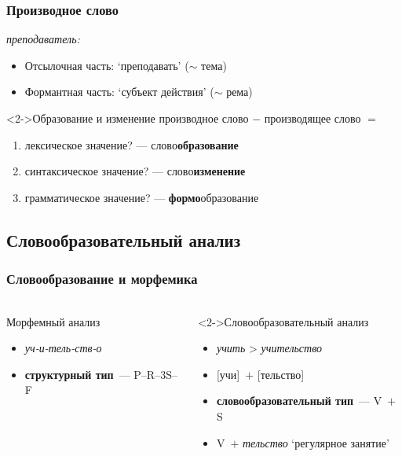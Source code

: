 \begin{frame}
    \frametitle{Производное слово}

    \textit{преподаватель:} \begin{itemize}
        \item Отсылочная часть: `преподавать' ($\sim$ тема)
        \item Формантная часть: `субъект действия' ($\sim$ рема)
    \end{itemize}

    \vfill

    \begin{block}<2->{Образование и изменение}
        производное слово $-$ производящее слово $=$ \begin{enumerate}
            \item лексическое значение? --- слово\textbf{образование}
            \item синтаксическое значение? --- слово\textbf{изменение}
            \item грамматическое значение? --- \textbf{формо}образование
        \end{enumerate}
    \end{block}

\end{frame}

\subsection{Словообразовательный анализ}


\begin{frame}
    \frametitle{Словообразование и морфемика}
    \framesubtitle{\autocite[16--19]{gerd:2004:morphology}}

    \begin{columns}
        \begin{block}{Морфемный анализ}
            \begin{itemize}
                \item \textit{уч-и-тель-ств-о}
                \item \textbf{структурный тип}~--- P--R--3S--F
            \end{itemize}
        \end{block}

        \begin{block}<2->{Словообразовательный анализ}
            \begin{itemize}
                \item \textit{учить} > \textit{учительство}
                \item {[учи]}~$+$ [тельство]
                \item \textbf{словообразовательный тип}~--- V~$+$ S
                \item V~$+$ \textit{тельство} `регулярное занятие'
            \end{itemize}
        \end{block}
    \end{columns}
\end{frame}

